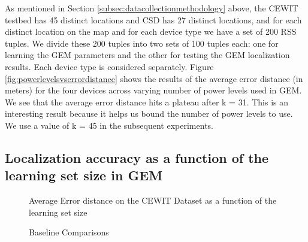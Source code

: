 \documentclass{Localization-PaperWriteupDraft}
\begin{document}
As mentioned in Section \ref{subsec:datacollectionmethodology} above, the CEWIT testbed has 45 distinct locations and CSD has 27 distinct locations, and for each distinct location on the map and for each device type we have a set of 200 RSS tuples. We divide these 200 tuples into two sets of 100 tuples each: one for learning the GEM parameters and the other for testing the GEM localization results. Each device type is considered separately. Figure \ref{fig:powerlevelsvserrordistance} shows the results of the average error distance (in meters) for the four devices across varying number of power levels used in GEM. We see that the average error distance hits a plateau after k = 31. This is an interesting result because it helps us bound the number of power levels to use. We use a value of k = 45 in the subsequent experiments. 

\subsection{Localization accuracy as a function of the learning set size in GEM}
\label{subsec:localizationaccuracyasafunctionofthelearningsetsizeingem}

\begin{figure}
\centering
  \caption{Average Error distance on the CEWIT Dataset as a function of the learning set size}
  \label{fig:learningsetsizevserrordistance}
\end{figure}

\begin{figure}
	\centering
	\caption{Baseline Comparisons}
	\label{fig:baselinecomparisons}
\end{figure}
\end{document}
